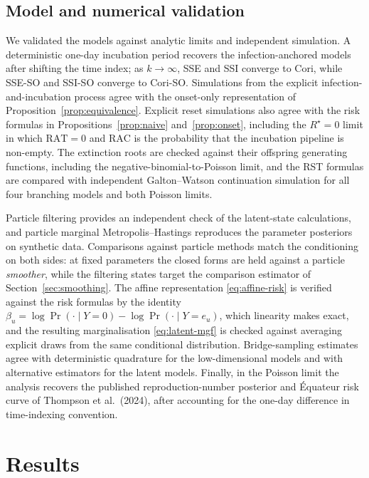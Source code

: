 \documentclass[11pt,a4paper]{article}
\theoremstyle{plain}
\theoremstyle{definition}
\newcommand{\Rreset}{R^{\star}}
\newcommand{\RAC}{\mathrm{RAC}}
\newcommand{\RAT}{\mathrm{RAT}}
\newcommand{\sse}{SSE}
\newcommand{\ssi}{SSI}
\newcommand{\sseso}{SSE-SO}
\newcommand{\ssiso}{SSI-SO}
\newcommand{\cori}{Cori}
\newcommand{\coriso}{Cori-SO}
\begin{document}
\subsection{Model and numerical validation}
\label{sec:verification}

We validated the models against analytic limits and independent simulation. A deterministic
one-day incubation period recovers the infection-anchored models after shifting the time index;
as $k\to\infty$, \sse{} and \ssi{} converge to \cori{}, while \sseso{} and \ssiso{} converge to
\coriso{}. Simulations from the explicit infection-and-incubation process agree with the
onset-only representation of Proposition~\ref{prop:equivalence}. Explicit reset simulations also
agree with the risk formulas in Propositions~\ref{prop:naive} and~\ref{prop:onset}, including the
$\Rreset=0$ limit in which $\RAT=0$ and $\RAC$ is the probability that the incubation pipeline is
non-empty.
The extinction roots are checked against their offspring generating functions, including the
negative-binomial-to-Poisson limit, and the RST formulas are compared with independent
Galton--Watson continuation simulation for all four branching models and both Poisson limits.

Particle filtering provides an independent check of the latent-state calculations, and particle
marginal Metropolis--Hastings reproduces the parameter posteriors on synthetic data. Comparisons
against particle methods match the conditioning on both sides: at fixed parameters the closed
forms are held against a particle \emph{smoother}, while the filtering states target the
comparison estimator of Section~\ref{sec:smoothing}. The affine representation
\eqref{eq:affine-risk} is verified against the risk formulas by the identity
$\beta_u = \log \Pr(\cdot \mid Y = 0) - \log \Pr(\cdot \mid Y = e_u)$, which linearity makes
exact, and the resulting marginalisation \eqref{eq:latent-mgf} is checked against averaging
explicit draws from the same conditional distribution. Bridge-sampling estimates agree with
deterministic quadrature for
the low-dimensional models and with alternative estimators for the latent models. Finally, in
the Poisson limit the analysis recovers the published reproduction-number posterior and
\'Equateur risk curve of Thompson et al.\ (2024), after accounting for the one-day difference in
time-indexing convention.

\section{Results}
\label{sec:results}
\end{document}
